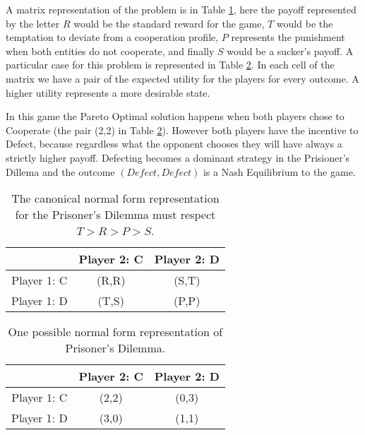 A matrix representation of the problem is in Table \ref{tab:prisionersdillema_tab1}, here the payoff represented by the letter $R$ would be the standard reward for the game, $T$ would be the temptation to deviate from a cooperation profile, $P$ represents the punishment when both entities do not cooperate, and finally $S$ would be a sucker's payoff. A particular case for this problem is represented in Table \ref{tab:prisionersdillema_tab2}. In each cell of the matrix we have a pair of the expected utility for the players for every outcome. A higher utility represents a more desirable state.

In this game the Pareto Optimal solution happens when both players chose to Cooperate (the pair (2,2) in Table \ref{tab:prisionersdillema_tab2}). However both players have the incentive to Defect, because regardless what the opponent chooses they will have always a strictly higher payoff. Defecting becomes a dominant strategy in the Prisioner's Dillema and the outcome $(Defect, Defect)$ is a Nash Equilibrium to the game. 

\begin{center}
\begin{table}[h]
\begin{centering}
\begin{tabular}{ccc}
\hline 
 & Player 2: C & Player 2: D\tabularnewline
\hline 
Player 1: C & (R,R) & (S,T)\tabularnewline
Player 1: D & (T,S) & (P,P)\tabularnewline
\hline 
\end{tabular}
\par\end{centering}

\caption{The canonical normal form representation for the Prisoner's Dilemma must respect $T>R>P>S$.}
\label{tab:prisionersdillema_tab1}
\end{table}
\par\end{center}

\begin{center}
\begin{table}[h]
\begin{centering}
\begin{tabular}{ccc}
\hline 
 & Player 2: C & Player 2: D\tabularnewline
\hline 
Player 1: C & (2,2) & (0,3)\tabularnewline
Player 1: D & (3,0) & (1,1)\tabularnewline
\hline 
\end{tabular}
\par\end{centering}

\caption{One possible normal form representation of Prisoner's Dilemma.}
\label{tab:prisionersdillema_tab2}
\end{table}
\par
\end{center}



